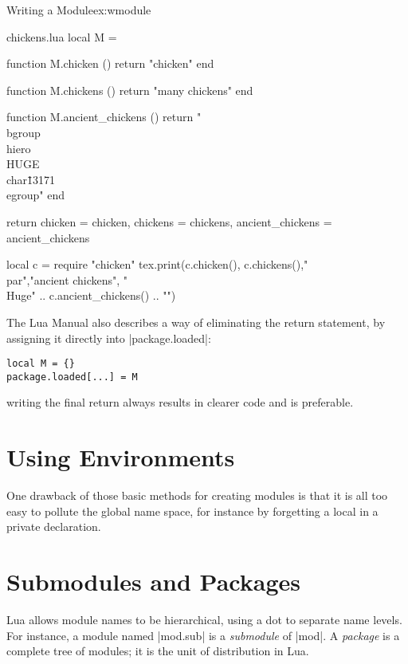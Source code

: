 \begin{texexample}{Writing a Module}{ex:wmodule}
\begin{filecontents*}{chickens.lua}
local M = {}

function M.chicken ()
  return "chicken"
end

function M.chickens ()
  return "many chickens" 
end

function M.ancient_chickens ()
  return "\\bgroup\\hiero\\HUGE\\char\"13171 \\egroup"
end

return {chicken           = chicken,
        chickens          = chickens,
        ancient_chickens  = ancient_chickens}
\end{filecontents*}

\begin{luacode*}
   local c = require "chicken"
   tex.print(c.chicken(), c.chickens(),"\\par","ancient chickens", "{\\Huge" .. c.ancient_chickens() .. "}")
\end{luacode*}
\end{texexample}



The Lua Manual also describes a way of eliminating the return statement, by assigning it directly into |package.loaded|:

\begin{verbatim}
local M = {}
package.loaded[...] = M
\end{verbatim}

writing the final return always results in clearer code and is preferable.

\section{Using Environments}

One drawback of those basic methods for creating modules is that it is all too easy to pollute the global name space, for instance by forgetting a local in a private declaration.

\section{Submodules and Packages}

Lua allows module names to be hierarchical, using a dot to separate name levels. For instance, a module named |mod.sub| is a \textit{submodule} of |mod|. A \textit{package} is a complete tree of modules; it is the unit of distribution in Lua. 

